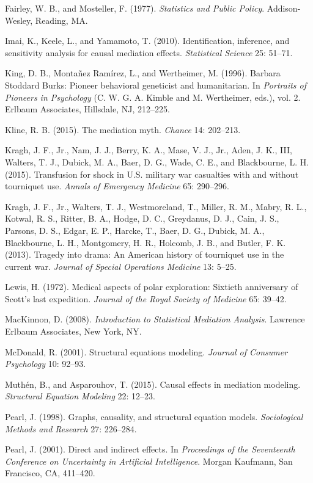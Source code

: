 \documentclass[11pt,a5paper,twoside]{book}
\begin{document}
Fairley, W. B., and Mosteller, F. (1977). \textit{Statistics and Public Policy}. Addison-Wesley, Reading, MA.

Imai, K., Keele, L., and Yamamoto, T. (2010). Identification, inference, and sensitivity analysis for causal mediation effects. \textit{Statistical Science} 25: 51–71.

King, D. B., Montañez Ramírez, L., and Wertheimer, M. (1996). Barbara Stoddard Burks: Pioneer behavioral geneticist and humanitarian. In \textit{Portraits of Pioneers in Psychology} (C. W. G. A. Kimble and M. Wertheimer, eds.), vol. 2. Erlbaum Associates, Hillsdale, NJ, 212–225.

Kline, R. B. (2015). The mediation myth. \textit{Chance} 14: 202–213.

Kragh, J. F., Jr., Nam, J. J., Berry, K. A., Mase, V. J., Jr., Aden, J. K., III, Walters, T. J., Dubick, M. A., Baer, D. G., Wade, C. E., and Blackbourne, L. H. (2015). Transfusion for shock in U.S. military war casualties with and without tourniquet use. \textit{Annals of Emergency Medicine} 65: 290–296.

Kragh, J. F., Jr., Walters, T. J., Westmoreland, T., Miller, R. M., Mabry, R. L., Kotwal, R. S., Ritter, B. A., Hodge, D. C., Greydanus, D. J., Cain, J. S., Parsons, D. S., Edgar, E. P., Harcke, T., Baer, D. G., Dubick, M. A., Blackbourne, L. H., Montgomery, H. R., Holcomb, J. B., and Butler, F. K. (2013). Tragedy into drama: An American history of tourniquet use in the current war. \textit{Journal of Special Operations Medicine} 13: 5–25.

Lewis, H. (1972). Medical aspects of polar exploration: Sixtieth anniversary of Scott’s last expedition. \textit{Journal of the Royal Society of Medicine} 65: 39–42.

MacKinnon, D. (2008). \textit{Introduction to Statistical Mediation Analysis}. Lawrence Erlbaum Associates, New York, NY.

McDonald, R. (2001). Structural equations modeling. \textit{Journal of Consumer Psychology} 10: 92–93.

Muthén, B., and Asparouhov, T. (2015). Causal effects in mediation modeling. \textit{Structural Equation Modeling} 22: 12–23.

Pearl, J. (1998). Graphs, causality, and structural equation models. \textit{Sociological Methods and Research} 27: 226–284.

Pearl, J. (2001). Direct and indirect effects. In \textit{Proceedings of the Seventeenth Conference on Uncertainty in Artificial Intelligence}. Morgan Kaufmann, San Francisco, CA, 411–420.
\end{document}
